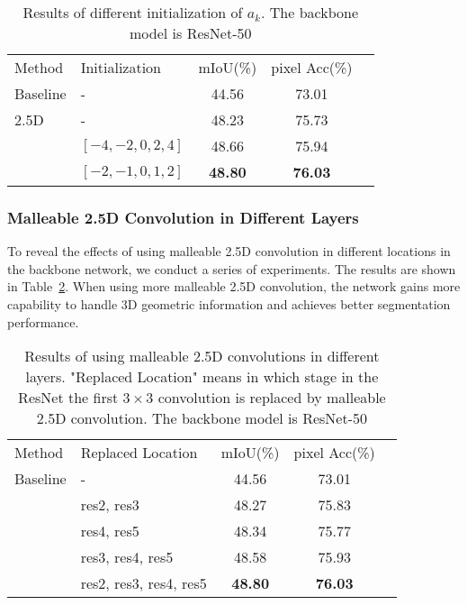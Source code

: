 \documentclass[runningheads]{llncs}
\begin{document}
\begin{table}[htbp]
  \begin{center}
  \caption{
  Results of different initialization of $a_k$.
  The backbone model is ResNet-50
  }
  \label{table:ablation_initialization}
  \setlength{\tabcolsep}{10pt}
  \begin{tabular}{llccc}
    \hline\noalign{\smallskip}
    Method & Initialization & mIoU(\%) & pixel Acc(\%)\\
    \noalign{\smallskip}
    \hline
    \noalign{\smallskip}
    Baseline      & - & 44.56  & 73.01 \\
    2.5D\cite{2_5D}          & - & 48.23 & 75.73 \\
    \noalign{\smallskip}
    \hline
    \noalign{\smallskip}
    \multirow{2}{*}{Malleable 2.5D} & $[-4,-2,0,2,4]$ & 48.66 & 75.94 \\
     & $[-2,-1,0,1,2]$ & \textbf{48.80} & \textbf{76.03} \\
    \hline
  \end{tabular}
  \end{center}
\end{table}

\subsubsection{Malleable 2.5D Convolution in Different Layers}
To reveal the effects of using malleable 2.5D convolution in different locations in the backbone network, we conduct a series of experiments.
The results are shown in Table~\ref{table:ablation_location}.
When using more malleable 2.5D convolution, the network gains more capability to handle 3D geometric information and achieves better segmentation performance.

\begin{table}[htbp]
  \begin{center}
  \caption{
  Results of using malleable 2.5D convolutions in different layers.
  "Replaced Location" means in which stage in the ResNet the first $3\times 3$ convolution is replaced by malleable 2.5D convolution.
  The backbone model is ResNet-50
  }
  \label{table:ablation_location}
  \setlength{\tabcolsep}{10pt}
  \begin{tabular}{llccc}
    \hline\noalign{\smallskip}
    Method & Replaced Location & mIoU(\%) & pixel Acc(\%)\\
    \noalign{\smallskip}
    \hline
    \noalign{\smallskip}
    Baseline      & - & 44.56  & 73.01 \\
    \noalign{\smallskip}
    \hline
    \noalign{\smallskip}
    \multirow{4}{*}{Malleable 2.5D} & res2, res3 & 48.27 & 75.83 \\
     & res4, res5             & 48.34 & 75.77 \\
     & res3, res4, res5       & 48.58 & 75.93 \\
     & res2, res3, res4, res5 & \textbf{48.80} & \textbf{76.03} \\
    \hline
  \end{tabular}
  \end{center}
\end{table}
\end{document}
